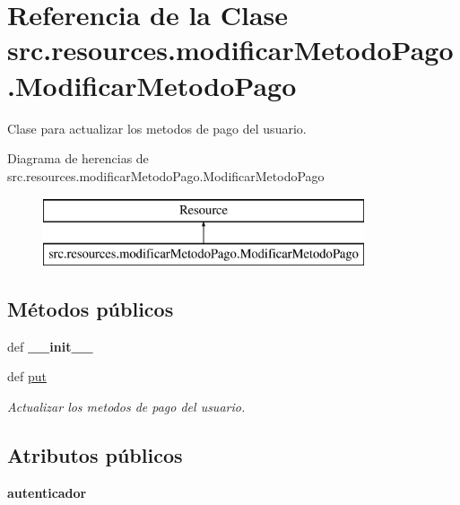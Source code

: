 \hypertarget{classsrc_1_1resources_1_1modificar_metodo_pago_1_1_modificar_metodo_pago}{\section{Referencia de la Clase src.\-resources.\-modificar\-Metodo\-Pago.\-Modificar\-Metodo\-Pago}
\label{classsrc_1_1resources_1_1modificar_metodo_pago_1_1_modificar_metodo_pago}
}


Clase para actualizar los metodos de pago del usuario.  


Diagrama de herencias de src.\-resources.\-modificar\-Metodo\-Pago.\-Modificar\-Metodo\-Pago\begin{figure}[H]
\begin{center}
\leavevmode
\includegraphics[height=2.000000cm]{classsrc_1_1resources_1_1modificar_metodo_pago_1_1_modificar_metodo_pago}
\end{center}
\end{figure}
\subsection*{Métodos públicos}
\begin{DoxyCompactItemize}
\item 
\hypertarget{classsrc_1_1resources_1_1modificar_metodo_pago_1_1_modificar_metodo_pago_a541b9f80b6fe3411c7fa5108c37425f9}{def {\bfseries \-\_\-\-\_\-init\-\_\-\-\_\-}}\label{classsrc_1_1resources_1_1modificar_metodo_pago_1_1_modificar_metodo_pago_a541b9f80b6fe3411c7fa5108c37425f9}

\item 
def \hyperlink{classsrc_1_1resources_1_1modificar_metodo_pago_1_1_modificar_metodo_pago_ab57316b6b19630da0ecd000bc48644d4}{put}
\begin{DoxyCompactList}\small\item\em Actualizar los metodos de pago del usuario. \end{DoxyCompactList}\end{DoxyCompactItemize}
\subsection*{Atributos públicos}
\begin{DoxyCompactItemize}
\item 
\hypertarget{classsrc_1_1resources_1_1modificar_metodo_pago_1_1_modificar_metodo_pago_ac6eaf4d4145d261d417cef14c7c8ddad}{{\bfseries autenticador}}\label{classsrc_1_1resources_1_1modificar_metodo_pago_1_1_modificar_metodo_pago_ac6eaf4d4145d261d417cef14c7c8ddad}

\end{DoxyCompactItemize}
